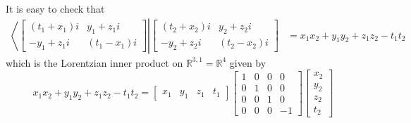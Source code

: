 \documentclass[10pt, letterpaper]{article}
\begin{document}
It is easy to check that
$$
\begin{aligned}
\left\langle\left[\begin{array}{cc}
\left(t_{1}+x_{1}\right) i & y_{1}+z_{1} i \\
-y_{1}+z_{1} i & \left(t_{1}-x_{1}\right) i
\end{array}\right]\right|\left[\begin{array}{cc}
\left(t_{2}+x_{2}\right) i & y_{2}+z_{2} i \\
-y_{2}+z_{2} i & \left(t_{2}-x_{2}\right) i
\end{array}\right] & =x_{1} x_{2}+y_{1} y_{2}+z_{1} z_{2}-t_{1} t_{2}
\end{aligned}
$$
which is the Lorentzian inner product on $\mathbb{R}^{3,1}=\mathbb{R}^{4}$ given by
$$
x_{1} x_{2}+y_{1} y_{2}+z_{1} z_{2}-t_{1} t_{2}=\left[\begin{array}{llll}
x_{1} & y_{1} & z_{1} & t_{1}
\end{array}\right]\left[\begin{array}{rrrr}
1 & 0 & 0 & 0 \\
0 & 1 & 0 & 0 \\
0 & 0 & 1 & 0 \\
0 & 0 & 0 & -1
\end{array}\right]\left[\begin{array}{l}
x_{2} \\
y_{2} \\
z_{2} \\
t_{2}
\end{array}\right]
$$
\end{document}
